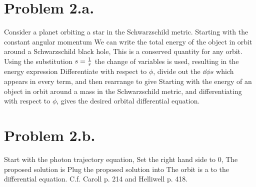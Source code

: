 \documentclass{article}
\begin{document}
\section*{Problem 2.a.}
Consider a planet orbiting a star in the Schwarzschild metric. Starting with the constant angular momentum
We can write the total energy of the object in orbit around a Schwarzschild black hole,
This is a conserved quantity for any orbit. Using the substitution $s=\frac{1}{r}$ the change of variables is used,
resulting in the energy expression
Differentiate with respect to $\phi$, divide out the $\dd{\phi}s$ which appears in every term, and then rearrange to give
Starting with the energy of an object in orbit around a mass in the Schwarzschild metric, and differentiating with respect to $\phi$, gives the desired orbital differential equation.
\section*{Problem 2.b.}
Start with the photon trajectory equation,
Set the right hand side to 0,
The proposed solution is
Plug the proposed solution into 
The orbit is a  to the differential equation. C.f. Caroll p. 214 and Helliwell p. 418.
\end{document}
